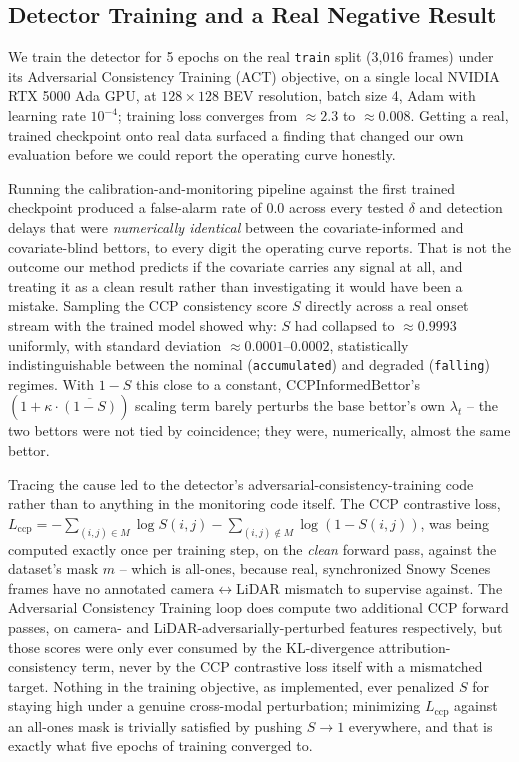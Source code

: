 \subsection{Detector Training and a Real Negative Result}
\label{sec:training}

We train the detector for 5 epochs on the real \texttt{train} split (3{,}016 frames) under its Adversarial Consistency Training (ACT) objective, on a single local NVIDIA RTX 5000 Ada GPU, at $128\times128$ BEV resolution, batch size 4, Adam with learning rate $10^{-4}$; training loss converges from $\approx 2.3$ to $\approx 0.008$. Getting a real, trained checkpoint onto real data surfaced a finding that changed our own evaluation before we could report the operating curve honestly.

Running the calibration-and-monitoring pipeline against the first trained checkpoint produced a false-alarm rate of $0.0$ across every tested $\delta$ and detection delays that were \emph{numerically identical} between the covariate-informed and covariate-blind bettors, to every digit the operating curve reports. That is not the outcome our method predicts if the covariate carries any signal at all, and treating it as a clean result rather than investigating it would have been a mistake. Sampling the CCP consistency score $S$ directly across a real onset stream with the trained model showed why: $S$ had collapsed to $\approx 0.9993$ uniformly, with standard deviation $\approx 0.0001$--$0.0002$, statistically indistinguishable between the nominal (\texttt{accumulated}) and degraded (\texttt{falling}) regimes. With $1 - S$ this close to a constant, $\text{CCPInformedBettor}$'s $(1 + \kappa \cdot \overline{(1-S)})$ scaling term barely perturbs the base bettor's own $\lambda_t$ -- the two bettors were not tied by coincidence; they were, numerically, almost the same bettor.

Tracing the cause led to the detector's adversarial-consistency-training code rather than to anything in the monitoring code itself. The CCP contrastive loss, $L_{\mathrm{ccp}} = -\sum_{(i,j) \in M} \log S(i,j) - \sum_{(i,j) \notin M} \log(1 - S(i,j))$, was being computed exactly once per training step, on the \emph{clean} forward pass, against the dataset's mask $m$ -- which is all-ones, because real, synchronized Snowy Scenes frames have no annotated camera$\leftrightarrow$LiDAR mismatch to supervise against. The Adversarial Consistency Training loop does compute two additional CCP forward passes, on camera- and LiDAR-adversarially-perturbed features respectively, but those scores were only ever consumed by the KL-divergence attribution-consistency term, never by the CCP contrastive loss itself with a mismatched target. Nothing in the training objective, as implemented, ever penalized $S$ for staying high under a genuine cross-modal perturbation; minimizing $L_{\mathrm{ccp}}$ against an all-ones mask is trivially satisfied by pushing $S \to 1$ everywhere, and that is exactly what five epochs of training converged to.

